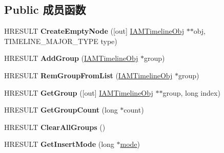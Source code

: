 \subsection*{Public 成员函数}
\begin{DoxyCompactItemize}
\item 
\mbox{\label{interface_i_a_m_timeline_a6efa7c346cc97364615b875b41c98c2d}} 
H\+R\+E\+S\+U\+LT {\bfseries Create\+Empty\+Node} (\mbox{[}out\mbox{]} \hyperlink{interface_i_a_m_timeline_obj}{I\+A\+M\+Timeline\+Obj} $\ast$$\ast$obj, T\+I\+M\+E\+L\+I\+N\+E\+\_\+\+M\+A\+J\+O\+R\+\_\+\+T\+Y\+PE type)
\item 
\mbox{\label{interface_i_a_m_timeline_aa78cb54b2bd5e61a81c45fba6be538a1}} 
H\+R\+E\+S\+U\+LT {\bfseries Add\+Group} (\hyperlink{interface_i_a_m_timeline_obj}{I\+A\+M\+Timeline\+Obj} $\ast$group)
\item 
\mbox{\label{interface_i_a_m_timeline_a62f82f9c50128cfb657c06f6afcf1606}} 
H\+R\+E\+S\+U\+LT {\bfseries Rem\+Group\+From\+List} (\hyperlink{interface_i_a_m_timeline_obj}{I\+A\+M\+Timeline\+Obj} $\ast$group)
\item 
\mbox{\label{interface_i_a_m_timeline_ac3281a7e2b66d50104adb839c4506d98}} 
H\+R\+E\+S\+U\+LT {\bfseries Get\+Group} (\mbox{[}out\mbox{]} \hyperlink{interface_i_a_m_timeline_obj}{I\+A\+M\+Timeline\+Obj} $\ast$$\ast$group, long index)
\item 
\mbox{\label{interface_i_a_m_timeline_affb7b0a0cb28dcfd6cd16358a670256f}} 
H\+R\+E\+S\+U\+LT {\bfseries Get\+Group\+Count} (long $\ast$count)
\item 
\mbox{\label{interface_i_a_m_timeline_af050f5c3367d498f67e134bd319776cd}} 
H\+R\+E\+S\+U\+LT {\bfseries Clear\+All\+Groups} ()
\item 
\mbox{\label{interface_i_a_m_timeline_a2f44ed227ba2b7b3e4075dc43be5e487}} 
H\+R\+E\+S\+U\+LT {\bfseries Get\+Insert\+Mode} (long $\ast$\hyperlink{interfacevoid}{mode})
\item 
\mbox{\label{interface_i_a_m_timeline_a3cbcb69a46df7234dfd7f6096f3f303b}} 

\end{DoxyCompactItemize}
